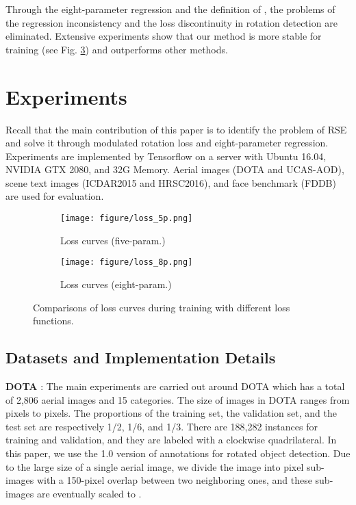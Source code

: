 \documentclass[10pt,twocolumn,letterpaper]{article}
\begin{document}
Through the eight-parameter regression and the definition of , the problems of the regression inconsistency and the loss discontinuity in rotation detection are eliminated. Extensive experiments show that our method is more stable for training (see Fig. \ref{fig:loss_curve}) and outperforms other methods.

\section{Experiments}
Recall that the main contribution of this paper is to identify the problem of RSE and solve it through modulated rotation loss and eight-parameter regression. Experiments are implemented by Tensorflow \cite{abadi2016tensorflow} on a server with Ubuntu 16.04, NVIDIA GTX 2080, and 32G Memory. Aerial images (DOTA and UCAS-AOD), scene text images (ICDAR2015 and HRSC2016), and face benchmark (FDDB) are used for evaluation.

\begin{figure}[!tb]
    \centering
    \begin{subfigure}{.235\textwidth}
        \centering    \texttt{[image: figure/loss\_5p.png]}
        \caption{Loss curves (five-param.)}
        \label{fig:fig6_a}
    \end{subfigure}
    \begin{subfigure}{.235\textwidth}
        \centering    \texttt{[image: figure/loss\_8p.png]}
        \caption{Loss curves (eight-param.)}
        \label{fig:fig6_b}
    \end{subfigure}
    \vspace{-10pt}
    \caption{Comparisons of loss curves during training with different loss functions.}
    \label{fig:loss_curve}
    \vspace{-10pt}
\end{figure}

\subsection{Datasets and Implementation Details}
\textbf{DOTA} \cite{R18_xia2018dota}: The main experiments are carried out around DOTA which has a total of 2,806 aerial images and 15 categories. The size of images in DOTA ranges from  pixels to  pixels. The proportions of the training set, the validation set, and the test set are respectively 1/2, 1/6, and 1/3. There are 188,282 instances for training and validation, and they are labeled with a clockwise quadrilateral. In this paper, we use the 1.0 version of annotations for rotated object detection. Due to the large size of a single aerial image, we divide the image into  pixel sub-images with a 150-pixel overlap between two neighboring ones, and these sub-images are eventually scaled to .
\end{document}
